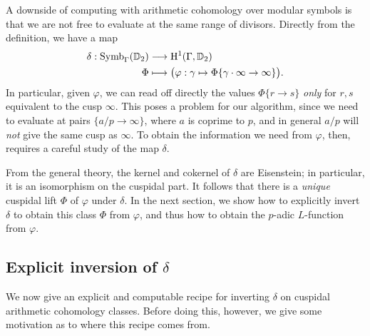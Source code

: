 \documentclass[a4paper,11pt]{article}
\numberwithin{equation}{section}
\begin{document}

A downside of computing with arithmetic cohomology over modular symbols is that we are not free to evaluate at the same range of divisors. Directly from the definition, we have a map
\begin{align*}
	\delta : \mathrm{Symb}_{\Gamma}(\mathbb{D}_2) &\longrightarrow \mathrm{H}^1(\Gamma,\mathbb{D}_2)\\
    \Phi &\longmapsto \big(\varphi: \gamma \mapsto \Phi\{\gamma\cdot\infty \rightarrow \infty\}\big).
\end{align*}
In particular, given $\varphi$, we can read off directly the values $\Phi\{r \to s\}$ \emph{only} for $r,s$ equivalent to the cusp $\infty$. This poses a problem for our algorithm, since we need to evaluate at pairs $\{a/p \to \infty\}$, where $a$ is coprime to $p$, and in general $a/p$ will \emph{not} give the same cusp as $\infty$. To obtain the information we need from $\varphi$, then, requires a careful study of the map $\delta$.

From the general theory, the kernel and cokernel of $\delta$ are Eisenstein; in particular, it is an isomorphism on the cuspidal part. It follows that there is a \emph{unique} cuspidal lift $\Phi$ of $\varphi$ under $\delta$. In the next section, we show how to explicitly invert $\delta$ to obtain this class $\Phi$ from $\varphi$, and thus how to obtain the $p$-adic $L$-function from $\varphi$.



\subsection{Explicit inversion of $\delta$}

We now give an explicit and computable recipe for inverting $\delta$ on cuspidal arithmetic cohomology classes. Before doing this, however, we give some motivation as to where this recipe comes from. 
\end{document}

